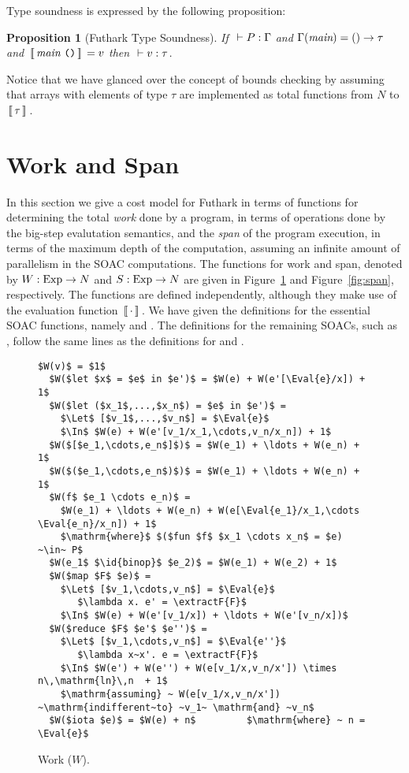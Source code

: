 \documentclass[oneside,11pt]{book}
\newtheorem{proposition}{Proposition}
\begin{document}
Type soundness is expressed by the following proposition:

\begin{proposition}[Futhark Type Soundness]
  If $~\vdash P : \Gamma$ and $\Gamma(\mbox{\it{main}}) = () \rightarrow \tau$ and
  $\,[\![\,\mbox{\it{main}}~\texttt{()}\,]\!]\, = v$ then $~\vdash v : \tau$.
\end{proposition}

Notice that we have glanced over the concept of bounds checking by
assuming that arrays with elements of type $\tau$ are implemented as
total functions from $N$ to $\,[\![\,\tau\,]\!]\,$.

\section{Work and Span}

In this section we give a cost model for Futhark in terms of functions
for determining the total \emph{work} done by a program, in terms of
operations done by the big-step evalutation semantics, and the
\emph{span} of the program execution, in terms of the maximum depth of
the computation, assuming an infinite amount of parallelism in the
SOAC computations. The functions for work and span, denoted by $W :
\mathrm{Exp} \rightarrow N$ and $S : \mathrm{Exp} \rightarrow N$ are
given in Figure~\ref{fig:work} and Figure~\ref{fig:span},
respectively. The functions are defined independently, although they
make use of the evaluation function $\,[\![\,\cdot\,]\!]\,$. We have given the
definitions for the essential SOAC functions, namely  and
. The definitions for the remaining SOACs, such as
, follow the same lines as the definitions for  and .

\begin{figure}
\begin{lstlisting}[mathescape=true]
  $W(v)$ = $1$
  $W($let $x$ = $e$ in $e')$ = $W(e) + W(e'[\Eval{e}/x]) + 1$
  $W($let ($x_1$,...,$x_n$) = $e$ in $e')$ =
    $\Let$ [$v_1$,...,$v_n$] = $\Eval{e}$
    $\In$ $W(e) + W(e'[v_1/x_1,\cdots,v_n/x_n]) + 1$
  $W($[$e_1,\cdots,e_n$]$)$ = $W(e_1) + \ldots + W(e_n) + 1$
  $W($($e_1,\cdots,e_n$)$)$ = $W(e_1) + \ldots + W(e_n) + 1$
  $W(f$ $e_1 \cdots e_n)$ =
    $W(e_1) + \ldots + W(e_n) + W(e[\Eval{e_1}/x_1,\cdots \Eval{e_n}/x_n]) + 1$
    $\mathrm{where}$ $($fun $f$ $x_1 \cdots x_n$ = $e) ~\in~ P$
  $W(e_1$ $\id{binop}$ $e_2)$ = $W(e_1) + W(e_2) + 1$
  $W($map $F$ $e)$ =
    $\Let$ [$v_1,\cdots,v_n$] = $\Eval{e}$
       $\lambda x. e' = \extractF{F}$
    $\In$ $W(e) + W(e'[v_1/x]) + \ldots + W(e'[v_n/x])$
  $W($reduce $F$ $e'$ $e'')$ =
    $\Let$ [$v_1,\cdots,v_n$] = $\Eval{e''}$
       $\lambda x~x'. e = \extractF{F}$
    $\In$ $W(e') + W(e'') + W(e[v_1/x,v_n/x']) \times n\,\mathrm{ln}\,n  + 1$
    $\mathrm{assuming} ~ W(e[v_1/x,v_n/x']) ~\mathrm{indifferent~to} ~v_1~ \mathrm{and} ~v_n$
  $W($iota $e)$ = $W(e) + n$         $\mathrm{where} ~ n = \Eval{e}$
\end{lstlisting}

\caption{Work ($W$).}
\label{fig:work}
\end{figure}
\end{document}
